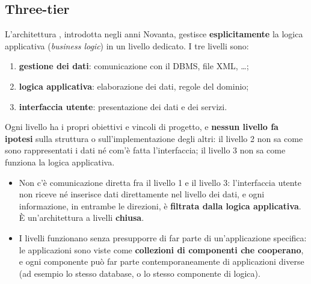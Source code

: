 
\subsection{Three-tier}

L'architettura , introdotta negli anni Novanta, gestisce \textbf{esplicitamente} la logica applicativa
(\textit{business logic}) in un livello dedicato. I tre livelli sono:
\begin{enumerate}
  \item \textbf{gestione dei dati}: comunicazione con il DBMS, file XML, \ldots;
  \item \textbf{logica applicativa}: elaborazione dei dati, regole del dominio;
  \item \textbf{interfaccia utente}: presentazione dei dati e dei servizi.
\end{enumerate}
Ogni livello ha i propri obiettivi e vincoli di progetto, e \textbf{nessun livello fa ipotesi} sulla struttura o
sull'implementazione degli altri: il livello 2 non sa come sono rappresentati i dati né com'è fatta l'interfaccia; il
livello 3 non sa come funziona la logica applicativa.

\begin{itemize}
  \item Non c'è comunicazione diretta fra il livello 1 e il livello 3: l'interfaccia utente non riceve né inserisce dati
        direttamente nel livello dei dati, e ogni informazione, in entrambe le direzioni, è \textbf{filtrata dalla logica
        applicativa}. È un'architettura a livelli \textbf{chiusa}.
  \item I livelli funzionano senza presupporre di far parte di un'applicazione specifica: le applicazioni sono viste come
        \textbf{collezioni di componenti che cooperano}, e ogni componente può far parte contemporaneamente di applicazioni
        diverse (ad esempio lo stesso database, o lo stesso componente di logica).
\end{itemize}

